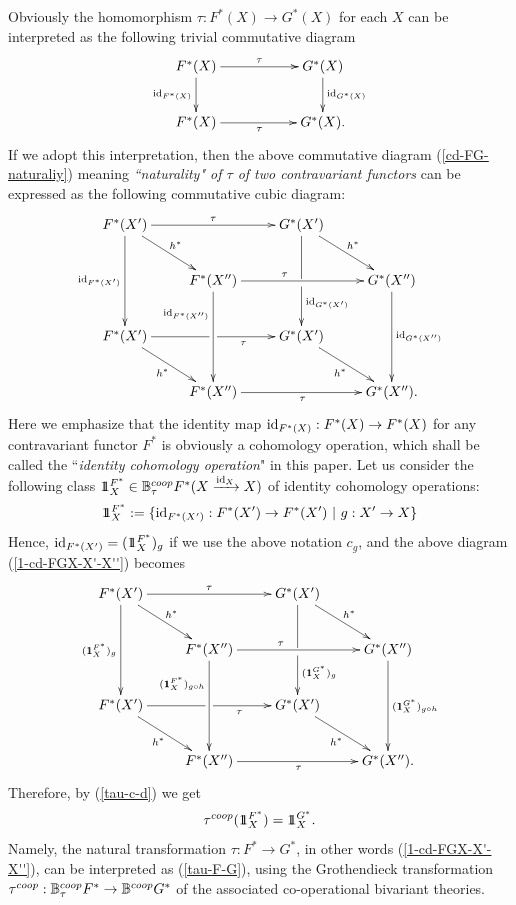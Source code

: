 \documentclass[a4paper]{amsart}
\begin{document}
Obviously the homomorphism $\tau: F^*(X) \to G^*(X)$ for each $X$ can be interpreted as the following trivial commutative diagram 
\begin{equation}\label{cd-FG-id}
\xymatrix
{ F^*(X) \ar[d]_{\op{id}_{F^*(X)}} \ar[rr]^{\tau} && G^*(X) \ar[d]^{\op{id}_{G^*(X)}}  \\
F^*(X) \ar[rr]_{\tau} && G^*(X). 
}
\end{equation}
If we adopt this interpretation, then the above commutative diagram (\ref{cd-FG-naturaliy}) meaning \emph{``naturality" of $\tau$ of two contravariant functors} can be expressed as the following commutative cubic diagram:
\begin{equation}\label{1-cd-FGX-X'-X''}
\xymatrix
{F^*(X') \ar[dd]_{\op{id}_{F^*(X')}} \ar[rd]^{h^*} \ar[rr]^{\tau} && G^*(X') \ar'[d][dd]^(.4){\op{id}_{G^*(X')}} \ar[rd]^{h^*} \\
& F^*(X'') \ar[dd]_(.3){ \op{id}_{F^*(X'')}} \ar[rr]^(.4){\tau}  &&  G^*(X'') \ar[dd]^{\op{id}_{G^*(X'')}} \\
F^*(X') \ar'[r] [rr]_{\tau \quad \quad }  \ar[rd]_{h^*} && G^*(X') \ar[rd]_{h^*} \\
& F^*(X'') \ar[rr] _{\tau }  &&  G^*(X'').
}
\end{equation}
Here we emphasize that the identity map $\operatorname{id}_{F^*(X)}:F^*(X) \to F^*(X)$ for any contravariant functor $F^*$ is obviously a cohomology operation, which shall be called the ``\emph{identity cohomology operation}" in this paper.
Let us consider the following class $1\hskip-3.5pt1_X^{F^*} \in \mathbb B^{coop}_{\tau}F^*(X \xrightarrow {\operatorname{id}_X} X)$ of 
identity cohomology operations:
$$1\hskip-3.5pt1_X^{F^*}:= \{ \operatorname{id}_{F^*(X')}:F^*(X') \to F^*(X') \, \, | \, \, g:X' \to X \}$$
Hence, $\operatorname{id}_{F^*(X')} = (1\hskip-3.5pt1_X^{F^*})_g$ if we use the above notation $c_g$, and  
the above diagram (\ref{1-cd-FGX-X'-X''}) becomes
\begin{equation}\label{1-cd-FGX-X'-X''-b}
\xymatrix
{F^*(X') \ar[dd]_{(\jeden_X^{F^*})_g} \ar[rd]^{h^*} \ar[rr]^{\tau} && G^*(X') \ar'[d][dd]^(.4){(\jeden_X^{G^*})_g} \ar[rd]^{h^*} \\
& F^*(X'') \ar[dd]_(.3){(\jeden_X^{F^*})_{g \circ h}} \ar[rr]^(.4){\tau}  &&  G^*(X'') \ar[dd]^{(\jeden_X^{G^*})_{g \circ h}} \\
F^*(X') \ar'[r] [rr]_{\tau \quad \quad }  \ar[rd]_{h^*} && G^*(X') \ar[rd]_{h^*} \\
& F^*(X'') \ar[rr] _{\tau }  &&  G^*(X'').
}
\end{equation}
Therefore, by (\ref{tau-c-d}) we get
\begin{equation}\label{tau-F-G}
\tau^{coop}(1\hskip-3.5pt1_X^{F^*})= 1\hskip-3.5pt1_X^{G^*}.
\end{equation}
Namely, the natural transformation $\tau:F^* \to G^*$, in other words (\ref{1-cd-FGX-X'-X''}), can be interpreted as (\ref{tau-F-G}), using the Grothendieck transformation $\tau^{coop}: \mathbb B^{coop}_{\tau}F^* \to \mathbb B^{coop}G^*$ of the associated co-operational bivariant theories. 
\end{document}
